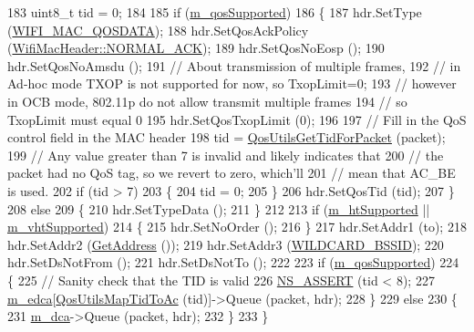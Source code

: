 \begin{DoxyCode}
183   uint8\_t tid = 0;
184 
185   \textcolor{keywordflow}{if} (\hyperlink{classns3_1_1RegularWifiMac_aeecdb918687493a8efdd70304bc0cee9}{m\_qosSupported})
186     \{
187       hdr.SetType (\hyperlink{namespacens3_a9318472db39b35b2092de5c721e6ab0aafd37aea1ac3edba5410fac6367b19b1d}{WIFI\_MAC\_QOSDATA});
188       hdr.SetQosAckPolicy (\hyperlink{classns3_1_1WifiMacHeader_ae3a382482f357972019f5e1b3162adc4a9f52b9c6ca65d046ce2be9d70bce28cf}{WifiMacHeader::NORMAL\_ACK});
189       hdr.SetQosNoEosp ();
190       hdr.SetQosNoAmsdu ();
191       \textcolor{comment}{// About transmission of multiple frames,}
192       \textcolor{comment}{// in Ad-hoc mode TXOP is not supported for now, so TxopLimit=0;}
193       \textcolor{comment}{// however in OCB mode, 802.11p do not allow transmit multiple frames}
194       \textcolor{comment}{// so TxopLimit must equal 0}
195       hdr.SetQosTxopLimit (0);
196 
197       \textcolor{comment}{// Fill in the QoS control field in the MAC header}
198       tid = \hyperlink{group__wifi_gaa7ad20082f78b63633d0557d24927150}{QosUtilsGetTidForPacket} (packet);
199       \textcolor{comment}{// Any value greater than 7 is invalid and likely indicates that}
200       \textcolor{comment}{// the packet had no QoS tag, so we revert to zero, which'll}
201       \textcolor{comment}{// mean that AC\_BE is used.}
202       \textcolor{keywordflow}{if} (tid > 7)
203         \{
204           tid = 0;
205         \}
206       hdr.SetQosTid (tid);
207     \}
208   \textcolor{keywordflow}{else}
209     \{
210       hdr.SetTypeData ();
211     \}
212 
213   \textcolor{keywordflow}{if} (\hyperlink{classns3_1_1RegularWifiMac_a8950c44b8cf2ad1f9274821cf88adc7b}{m\_htSupported} || \hyperlink{classns3_1_1RegularWifiMac_a151f330fdeb3f83f9ec7cf07537f0e86}{m\_vhtSupported})
214     \{
215       hdr.SetNoOrder ();
216     \}
217   hdr.SetAddr1 (to);
218   hdr.SetAddr2 (\hyperlink{classns3_1_1RegularWifiMac_aea719a7d05fbc664c50479fc900777b7}{GetAddress} ());
219   hdr.SetAddr3 (\hyperlink{namespacens3_aa7e7f97699766f2d1407d9151e3506a2}{WILDCARD\_BSSID});
220   hdr.SetDsNotFrom ();
221   hdr.SetDsNotTo ();
222 
223   \textcolor{keywordflow}{if} (\hyperlink{classns3_1_1RegularWifiMac_aeecdb918687493a8efdd70304bc0cee9}{m\_qosSupported})
224     \{
225       \textcolor{comment}{// Sanity check that the TID is valid}
226       \hyperlink{assert_8h_a6dccdb0de9b252f60088ce281c49d052}{NS\_ASSERT} (tid < 8);
227       \hyperlink{classns3_1_1RegularWifiMac_ac750365ab3708902cc0b7700164c706d}{m\_edca}[\hyperlink{group__wifi_ga4e36efcff6dd83eaee42e1af0de43d48}{QosUtilsMapTidToAc} (tid)]->Queue (packet, hdr);
228     \}
229   \textcolor{keywordflow}{else}
230     \{
231       \hyperlink{classns3_1_1RegularWifiMac_a152965c3def1a308b088b37c2c88a1a2}{m\_dca}->Queue (packet, hdr);
232     \}
233 \}
\end{DoxyCode}


